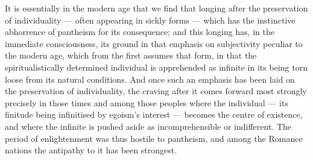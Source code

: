 \documentclass[12pt,a4paper]{book}
\begin{document}
It is essentially in the modern age that we find that longing after the
preservation of individuality --- often appearing in sickly forms --- which
has the instinctive abhorrence of pantheism for its consequence; and this
longing has, in the immediate consciousness, its ground in that emphasis on
subjectivity peculiar to the modern age, which from the first assumes that
form, in that the spiritualistically determined individual is apprehended as
infinite in its being torn loose from its natural conditions. And once such an
emphasis has been laid on the preservation of individuality, the craving after
it comes forward most strongly precisely in those times and among those
peoples where the individual --- its finitude being infinitised by egoism's
interest --- becomes the centre of existence, and where the infinite is pushed
aside as incomprehensible or indifferent. The period of enlightenment was thus
hostile to pantheism, and among the Romance nations the antipathy to it has
been strongest.
\end{document}

